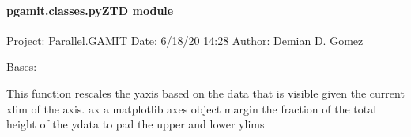 \documentclass[letterpaper,10pt,english]{sphinxmanual}
\begin{document}
\paragraph{pgamit.classes.pyZTD module}
\label{\detokenize{pgamit.classes:module-pgamit.classes.pyZTD}}\label{\detokenize{pgamit.classes:pgamit-classes-pyztd-module}}
\sphinxAtStartPar
Project: Parallel.GAMIT
Date: 6/18/20 14:28
Author: Demian D. Gomez

\begin{fulllineitems}
\label{\detokenize{pgamit.classes:pgamit.classes.pyZTD.Ztd}}
\pysigstartsignatures
\pysiglinewithargsret
{}
{\sphinxparamcomma {}\sphinxparamcomma {}\sphinxparamcomma {}\sphinxparamcomma {}}
{}
\pysigstopsignatures
\sphinxAtStartPar
Bases: 

\begin{fulllineitems}
\label{\detokenize{pgamit.classes:pgamit.classes.pyZTD.Ztd.adjust_lsq}}
\pysigstartsignatures
\pysiglinewithargsret
{}
{\sphinxparamcomma {}}
{}
\pysigstopsignatures
\end{fulllineitems}


\begin{fulllineitems}
\label{\detokenize{pgamit.classes:pgamit.classes.pyZTD.Ztd.autoscale_y}}
\pysigstartsignatures
\pysiglinewithargsret
{}
{\sphinxparamcomma {}}
{}
\pysigstopsignatures
\sphinxAtStartPar
This function rescales the y\sphinxhyphen{}axis based on the data that is visible given the current xlim of the axis.
ax \textendash{} a matplotlib axes object
margin \textendash{} the fraction of the total height of the y\sphinxhyphen{}data to pad the upper and lower ylims


\end{fulllineitems}
\end{fulllineitems}
\end{document}
